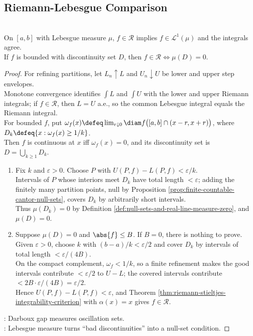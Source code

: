 \subsection{Riemann-Lebesgue Comparison}

\begin{theorem} \label{thm:riemann-lebesgue-comparison} \\
On $[a,b]$ with Lebesgue measure $\mu$, $f\in\mathcal{R}$ implies $f\in\mathscr{L}^1(\mu)$ and the integrals agree.\\
If $f$ is bounded with discontinuity set $D$, then $f\in\mathcal{R}\iff\mu(D)=0$.
\begin{proof}
For refining partitions, let $L_n\uparrow L$ and $U_n\downarrow U$ be lower and upper step envelopes.\\
Monotone convergence identifies $\int L$ and $\int U$ with the lower and upper Riemann integrals; if $f\in\mathcal{R}$, then $L=U$ a.e., so the common Lebesgue integral equals the Riemann integral.\\
For bounded $f$, put $\omega_f(x)\defeq \lim_{r\downarrow0}\diam f\bigl([a,b]\cap(x-r,x+r)\bigr)$, where $D_k\defeq\{x:\omega_f(x)\geq1/k\}$.\\
Then $f$ is continuous at $x$ iff $\omega_f(x)=0$, and its discontinuity set is $D=\bigcup_{k\geq1}D_k$.
\begin{enumerate}[label=\roman*.]
\setlength{\itemsep}{0pt}
\item[$(\Rightarrow)$] Fix $k$ and $\varepsilon>0$. Choose $P$ with $U(P,f)-L(P,f)<\varepsilon/k$.\\
Intervals of $P$ whose interiors meet $D_k$ have total length $<\varepsilon$; adding the finitely many partition points, null by Proposition \ref{prop:finite-countable-cantor-null-sets}, covers $D_k$ by arbitrarily short intervals.\\
Thus $\mu(D_k)=0$ by Definition \ref{def:null-sets-and-real-line-measure-zero}, and $\mu(D)=0$.
\item[$(\Leftarrow)$] Suppose $\mu(D)=0$ and $\abs{f}\leq B$. If $B=0$, there is nothing to prove. Given $\varepsilon>0$, choose $k$ with $(b-a)/k<\varepsilon/2$ and cover $D_k$ by intervals of total length $<\varepsilon/(4B)$.\\
On the compact complement, $\omega_f<1/k$, so a finite refinement makes the good intervals contribute $<\varepsilon/2$ to $U-L$; the covered intervals contribute $<2B\cdot\varepsilon/(4B)=\varepsilon/2$.\\
Hence $U(P,f)-L(P,f)<\varepsilon$, and Theorem \ref{thm:riemann-stieltjes-integrability-criterion} with $\alpha(x)=x$ gives $f\in\mathcal{R}$.
\end{enumerate}
: Darboux gap measures oscillation sets.\\
: Lebesgue measure turns ``bad discontinuities'' into a null-set condition.
\end{proof}
\end{theorem}


